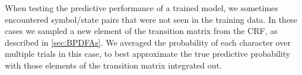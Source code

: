 When testing the predictive performance of a trained model, we sometimes encountered symbol/state pairs that were not seen in the training data.  In these cases we sampled a new element of the transition matrix from the CRF, as described in \ref{sec:BPDFAs}.  We averaged the probability of each character over multiple trials in this case, to best approximate the true predictive probability with those elements of the transition matrix integrated out.